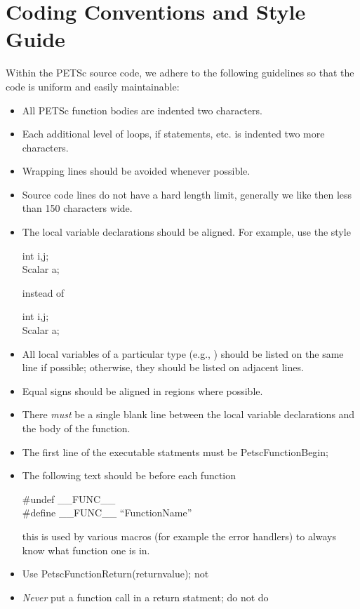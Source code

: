 \documentclass[twoside,12pt]{../sty/report_petsc}
\begin{document}
\section{Coding Conventions and Style Guide}

Within the PETSc source code, we adhere to the following guidelines
so that the code is uniform and easily maintainable:

\begin{itemize}
\item All PETSc function bodies are indented two characters.
\item Each additional level of loops, if statements, etc. is indented
      two more characters.
\item Wrapping lines should be avoided whenever possible.
\item Source code lines do not have a hard length limit, generally we like then less than 150 characters wide.
\item The local variable declarations should be aligned. For example,
      use the style
\begin{tabbing}
   int    i,j;\\
   Scalar a;
\end{tabbing}
instead of
\begin{tabbing}
   int i,j;\\
   Scalar a;
\end{tabbing}
\item All local variables of a particular type (e.g., ) should be 
      listed on the same line if possible; otherwise, they should be listed
      on adjacent lines.
\item Equal signs should be aligned in regions where possible.
\item There {\em must} be a single blank line
      between the local variable declarations and the body of the function.
\item The first line of the executable statments must be PetscFunctionBegin;
\item The following text should be before each function
\begin{tabbing}
\#undef \_\_FUNC\_\_\\
\#define \_\_FUNC\_\_ ``FunctionName''
\end{tabbing}
this is used by various macros (for example the error handlers) to always know
what function one is in.
\item Use PetscFunctionReturn(returnvalue); not 
\item {\em Never} put a function call in a return statment; do not do

\end{itemize}
\end{document}
